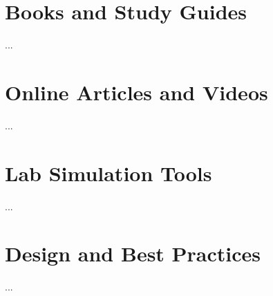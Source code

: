 \documentclass[a4paper]{report}
\begin{document}
\section{Books and Study Guides}
...

\section{Online Articles and Videos}
...

\section{Lab Simulation Tools}
...

\section{Design and Best Practices}
...

\end{document}
